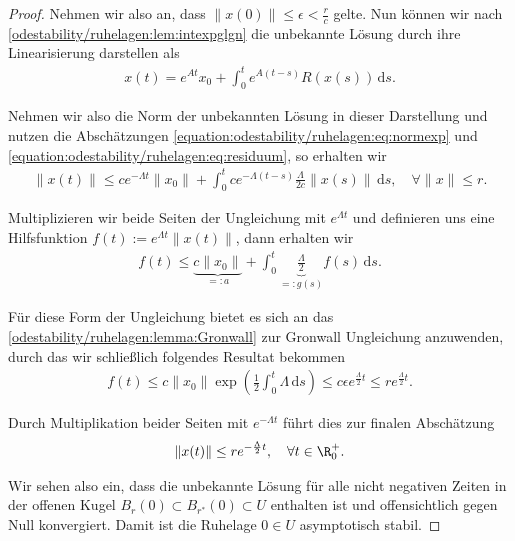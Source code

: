 \documentclass[letterpaper,10pt,english]{jupyterBook}
\begin{document}
\begin{proof}
\par
Nehmen wir also an, dass \(\|x(0)\| \leq \epsilon <\frac{r}{c}\) gelte.
Nun können wir nach \cref{odestability/ruhelagen:lem:intexpglgn} die unbekannte Lösung durch ihre Linearisierung darstellen als
\begin{align*}
x(t) = e^{At}x_0 + \int_0^t e^{A(t-s)} R(x(s))\, \mathrm{d}s.
\end{align*}
\par
Nehmen wir also die Norm der unbekannten Lösung in dieser Darstellung und nutzen die Abschätzungen \eqref{equation:odestability/ruhelagen:eq:normexp} und \eqref{equation:odestability/ruhelagen:eq:residuum}, so erhalten wir
\begin{align*}
\|x(t)\|\leq ce^{-\Lambda t}\|x_0\| + \int_0^tce^{-\Lambda (t-s)}\frac{\Lambda}{2c}\|x(s)\|\, \mathrm{d}s, \quad \forall \|x\| \leq r.
\end{align*}
\par
Multiplizieren wir beide Seiten der Ungleichung mit \(e^{\Lambda t}\) und definieren uns eine Hilfsfunktion \(f(t):=e^{\Lambda t}\|x(t)\|\), dann erhalten wir
\begin{align*}
f(t)\leq \underbrace{c\|x_0\|}_{=:a} + \int_0^t \underbrace{\frac{\Lambda}{2}}_{=:g(s)} f(s)\, \mathrm{d}s.
\end{align*}
\par
Für diese Form der Ungleichung bietet es sich an das \cref{odestability/ruhelagen:lemma:Gronwall} zur Gronwall Ungleichung anzuwenden, durch das wir schließlich folgendes Resultat bekommen
\begin{align*}
f(t) \leq c \|x_0\| \exp{\left( \frac{1}{2} \int_0^t \Lambda \, \mathrm{d}s \right) }
\leq c \epsilon e^{\frac{\Lambda}{2} t} \leq r e^{\frac{\Lambda}{2} t}.
\end{align*}
\par
Durch Multiplikation beider Seiten mit \(e^{-\Lambda t}\) führt dies zur finalen Abschätzung
\begin{align*}
 \|x(t)\|\leq re^{-\frac{\Lambda}{2}t}, \quad \forall t\in\R^+_0.
\end{align*}
\par
Wir sehen also ein, dass die unbekannte Lösung für alle nicht negativen Zeiten in der offenen Kugel \(B_r(0) \subset B_{{r^\ast}}(0) \subset U\) enthalten ist und offensichtlich gegen Null konvergiert.
Damit ist die Ruhelage \(0 \in U\) asymptotisch stabil.
\end{proof}
\end{document}
